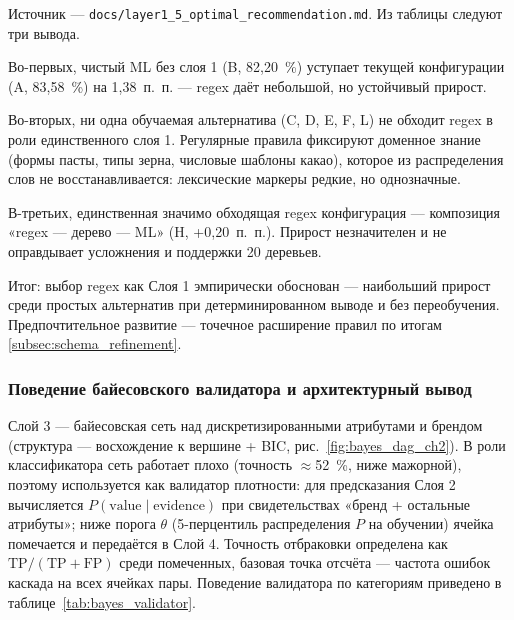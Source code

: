 Источник — \texttt{docs/layer1\_5\_optimal\_recommendation.md}. Из таблицы следуют три вывода.

Во-первых, чистый ML без слоя 1 (B, 82,20~\%) уступает текущей конфигурации (A, 83,58~\%) на 1,38~п.~п. — regex даёт небольшой, но устойчивый прирост.

Во-вторых, ни одна обучаемая альтернатива (C, D, E, F, L) не обходит regex в роли единственного слоя 1. Регулярные правила фиксируют доменное знание (формы пасты, типы зерна, числовые шаблоны какао), которое из распределения слов не восстанавливается: лексические маркеры редкие, но однозначные.

В-третьих, единственная значимо обходящая regex конфигурация — композиция «regex — дерево — ML» (H, +0,20~п.~п.). Прирост незначителен и не оправдывает усложнения и поддержки 20 деревьев.

Итог: выбор regex как Слоя 1 эмпирически обоснован — наибольший прирост среди простых альтернатив при детерминированном выводе и без переобучения. Предпочтительное развитие — точечное расширение правил по итогам \ref{subsec:schema_refinement}.

\subsubsection{Поведение байесовского валидатора и архитектурный вывод}
\label{subsubsec:bayes_behavior}

Слой 3 — байесовская сеть над дискретизированными атрибутами и брендом (структура — восхождение к вершине + BIC, рис.~\ref{fig:bayes_dag_ch2}). В роли классификатора сеть работает плохо (точность $\approx$52~\%, ниже мажорной), поэтому используется как валидатор плотности: для предсказания Слоя 2 вычисляется $P(\text{value}\mid\text{evidence})$ при свидетельствах «бренд + остальные атрибуты»; ниже порога $\theta$ (5-перцентиль распределения $P$ на обучении) ячейка помечается и передаётся в Слой 4. Точность отбраковки определена как $\text{TP}/(\text{TP}+\text{FP})$ среди помеченных, базовая точка отсчёта — частота ошибок каскада на всех ячейках пары. Поведение валидатора по категориям приведено в таблице~\ref{tab:bayes_validator}.

